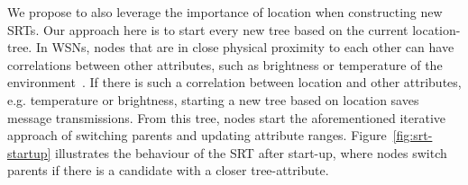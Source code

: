   We propose to also leverage the importance of location when constructing new SRTs. Our approach here is to start every new tree based on the current location-tree. In WSNs, nodes that are in close physical proximity to each other can have correlations between other attributes, such as brightness or temperature of the environment~\cite{madden_tinydb:_2005}. If there is such a correlation between location and other attributes, e.g. temperature or brightness, starting a new tree based on location saves message transmissions. From this tree, nodes start the aforementioned iterative approach of switching parents and updating attribute ranges. Figure~\ref{fig:srt-startup} illustrates the behaviour of the SRT after start-up, where nodes switch parents if there is a candidate with a closer tree-attribute.
